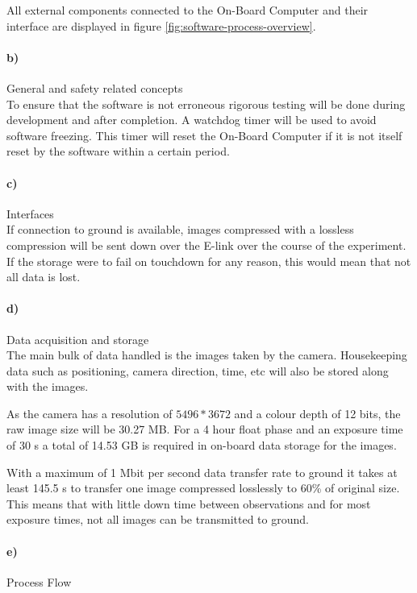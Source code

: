 All external components connected to the On-Board Computer and their interface are displayed in figure \ref{fig:software-process-overview}.

\paragraph{b)} General and safety related concepts\\

To ensure that the software is not erroneous rigorous testing will be done during development and after completion. A watchdog timer will be used to avoid software freezing. This timer will reset the On-Board Computer if it is not itself reset by the software within a certain period.

\paragraph{c)} Interfaces\\

If connection to ground is available, images compressed with a lossless compression will be sent down over the E-link over the course of the experiment. If the storage were to fail on touchdown for any reason, this would mean that not all data is lost.





\paragraph{d)} Data acquisition and storage\\

The main bulk of data handled is the images taken by the camera. Housekeeping data such as positioning, camera direction, time, etc will also be stored along with the images.

As the camera has a resolution of $5496 * 3672$ and a colour depth of 12 bits, the raw image size will be 30.27 MB. For a 4 hour float phase and an exposure time of 30 s a total of  14.53 GB is required in on-board data storage for the images. 

With a maximum of 1 Mbit per second data transfer rate to ground it takes at least 145.5 s to transfer one image compressed losslessly to 60\% of original size. This means that with little down time between observations and for most exposure times, not all images can be transmitted to ground.

\paragraph{e)} Process Flow\\

